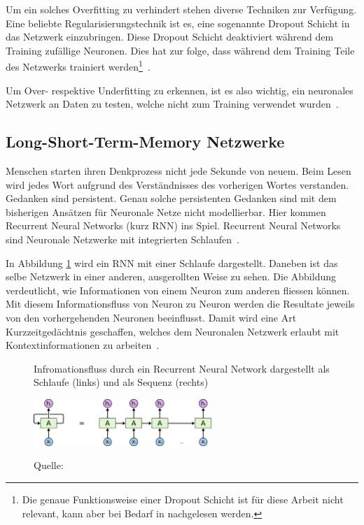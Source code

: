Um ein solches Overfitting zu verhindert stehen diverse Techniken zur Verfügung. Eine beliebte Regularisierungstechnik ist es, eine sogenannte Dropout Schicht in das Netzwerk einzubringen. Diese Dropout Schicht deaktiviert während dem Training zufällige Neuronen. Dies hat zur folge, dass während dem Training Teile des Netzwerks trainiert werden\footnote{Die genaue Funktionsweise einer Dropout Schicht ist für diese Arbeit nicht relevant, kann aber bei Bedarf in \textcite{Goodfellow2016} nachgelesen werden.}~\autocite{Goodfellow2016}.  

Um Over- respektive Underfitting zu erkennen, ist es also wichtig, ein neuronales Netzwerk an Daten zu testen, welche nicht zum Training verwendet wurden~\autocite{Krogh2008}.

\subsection{Long-Short-Term-Memory Netzwerke}

Menschen starten ihren Denkprozess nicht jede Sekunde von neuem. Beim Lesen wird jedes Wort aufgrund des Verständnisses des vorherigen Wortes verstanden. Gedanken sind persistent. Genau solche persistenten Gedanken sind mit dem bisherigen Ansätzen für Neuronale Netze nicht modellierbar. Hier kommen Recurrent Neural Networks (kurz RNN) ins Spiel. Recurrent Neural Networks sind Neuronale Netzwerke mit integrierten Schlaufen~\autocite{Olah2015}. 

In Abbildung \ref{rnn1} wird ein RNN mit einer Schlaufe dargestellt. Daneben ist das selbe Netzwerk in einer anderen, ausgerollten Weise zu sehen. Die Abbildung verdeutlicht, wie Informationen von einem Neuron zum anderen fliessen können. Mit diesem Informationsfluss von Neuron zu Neuron werden die Resultate jeweils von den vorhergehenden Neuronen beeinflusst. Damit wird eine Art Kurzzeitgedächtnis geschaffen, welches dem Neuronalen Netzwerk erlaubt mit Kontextinformationen zu arbeiten~\autocite{Olah2015}.
\begin{figure}[h]
    \captionsetup{width=.9\linewidth}
    \caption[Infromationsfluss durch ein Recurrent Neural Network]{Infromationsfluss durch ein Recurrent Neural Network dargestellt als Schlaufe (links) und als Sequenz (rechts)}
    \label{rnn1}
    \centering
    \vspace{0.2cm}
    \includegraphics[width=0.6\textwidth]{graphics/rnn1.png}\\
    \vspace{0.3cm}
    \caption*{Quelle: \textcite{Olah2015}}
\end{figure}


